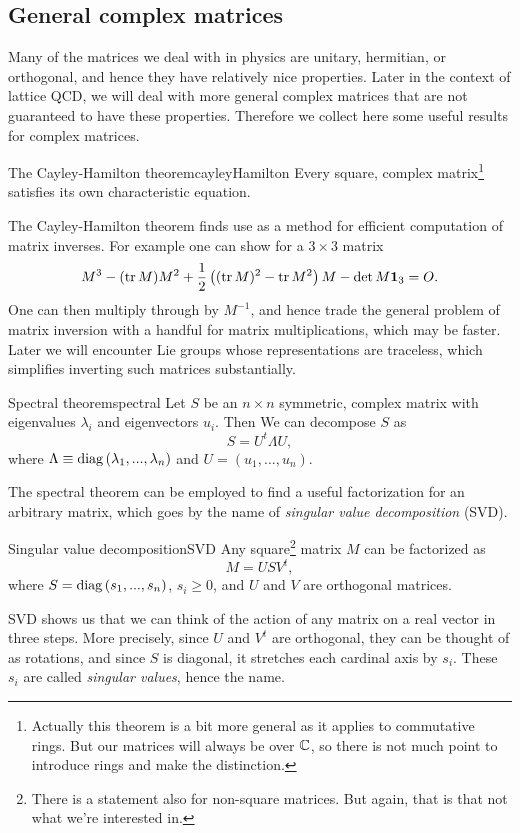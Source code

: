 \subsection{General complex matrices}

Many of the matrices we deal with in physics are unitary, hermitian,
or orthogonal, and hence they have relatively nice properties.
Later in the context of lattice QCD, we will deal with more general
complex matrices that are not guaranteed to have these properties.
Therefore we collect here some useful results for complex matrices.

\begin{theorem}{The Cayley-Hamilton theorem}{cayleyHamilton}
Every square, complex matrix\footnote{Actually this theorem is
a bit more general as it applies to commutative rings.
But our matrices will always be over $\mathbb{C}$, so there is not
much point to introduce rings and make the distinction.} 
satisfies its own characteristic equation.
\end{theorem}

The Cayley-Hamilton theorem finds use as a method for
efficient computation of matrix inverses. For
example one can show for a $3\times 3$ matrix
\begin{equation}\label{eq:inv3x3CH}
M^3-(\tr M) M^2+\frac{1}{2}\left((\tr M)^2-\tr M^2\right) M
-\det M  {\mathbf 1}_3=O.
\end{equation}
One can then multiply through by $M^{-1}$, and hence trade
the general problem of matrix inversion with a handful for matrix
multiplications, which may be faster.
Later we will encounter Lie groups whose representations
are traceless, which simplifies inverting such
matrices substantially.

\begin{theorem}{Spectral theorem}{spectral}
Let $S$ be an $n\times n$ symmetric, complex matrix with
eigenvalues $\lambda_i$ and eigenvectors $u_i$. Then
We can decompose $S$ as
$$
S=U^t\Lambda U,
$$
where $\Lambda\equiv\mathop{\mathrm{diag}}\left(\lambda_1,...,\lambda_n\right)$ and
$U=\left(u_1,...,u_n\right)$.
\end{theorem}

The spectral theorem can be employed to find a useful
factorization for an arbitrary matrix, which goes by
the name of 
{\it singular value decomposition} (SVD).
\begin{theorem}{Singular value decomposition}{SVD}
Any square\footnote{There is a statement also for non-square matrices.
But again, that is that not what we're interested in.}
matrix $M$ can be factorized as
$$
M=USV^t,
$$
where $S=\mathop{\mathrm{diag}}\left(s_1,...,s_n\right)$, $s_i\geq 0$,
and $U$ and $V$ are orthogonal matrices.
\end{theorem} 
SVD shows us that we can think of the action of any matrix on a real vector 
in three steps. More precisely, since $U$ and 
$V^t$ are orthogonal, they can be thought of
as rotations, and since $S$ is diagonal, it stretches each cardinal axis 
by $s_i$. These $s_i$ are called {\it singular values},
hence the name.

